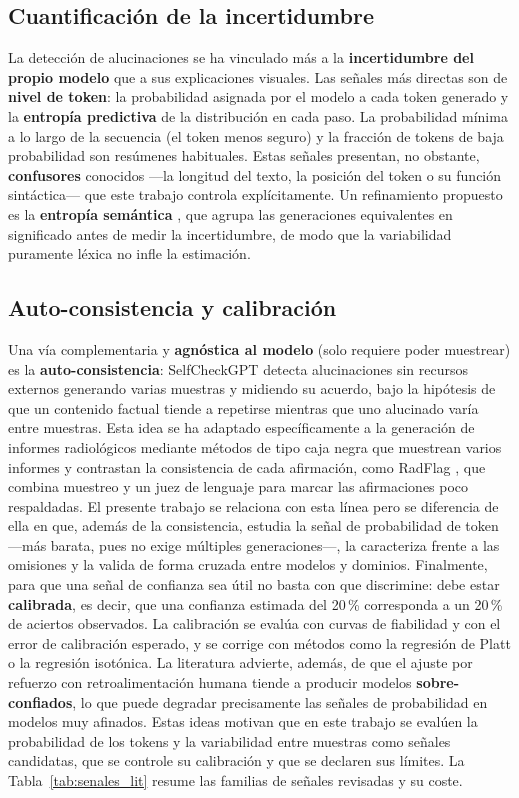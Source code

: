 \subsection{Cuantificación de la incertidumbre}
La detección de alucinaciones se ha vinculado más a la \textbf{incertidumbre del propio modelo} que a
sus explicaciones visuales. Las señales más directas son de \textbf{nivel de token}: la probabilidad
asignada por el modelo a cada token generado y la \textbf{entropía predictiva} de la distribución en
cada paso. La probabilidad mínima a lo largo de la secuencia (el token menos seguro) y la fracción de
tokens de baja probabilidad son resúmenes habituales. Estas señales presentan, no obstante,
\textbf{confusores} conocidos —la longitud del texto, la posición del token o su función sintáctica—
que este trabajo controla explícitamente. Un refinamiento propuesto es la \textbf{entropía semántica}
\parencite{kuhn2023}, que agrupa las generaciones equivalentes en significado antes de medir la
incertidumbre, de modo que la variabilidad puramente léxica no infle la estimación.

\subsection{Auto-consistencia y calibración}
Una vía complementaria y \textbf{agnóstica al modelo} (solo requiere poder muestrear) es la
\textbf{auto-consistencia}: SelfCheckGPT \parencite{manakul2023} detecta alucinaciones sin recursos
externos generando varias muestras y midiendo su acuerdo, bajo la hipótesis de que un contenido
factual tiende a repetirse mientras que uno alucinado varía entre muestras. Esta idea se ha adaptado
específicamente a la generación de informes radiológicos mediante métodos de tipo caja negra que
muestrean varios informes y contrastan la consistencia de cada afirmación, como RadFlag
\parencite{radflag2024}, que combina muestreo y un juez de lenguaje para marcar las afirmaciones poco
respaldadas. El presente trabajo se relaciona con esta línea pero se diferencia de ella en que, además
de la consistencia, estudia la señal de probabilidad de token —más barata, pues no exige múltiples
generaciones—, la caracteriza frente a las omisiones y la valida de forma cruzada entre modelos y
dominios. Finalmente, para que una
señal de confianza sea útil no basta con que discrimine: debe estar \textbf{calibrada}, es decir, que
una confianza estimada del 20\,\% corresponda a un 20\,\% de aciertos observados. La calibración se
evalúa con curvas de fiabilidad y con el error de calibración esperado, y se corrige con métodos como
la regresión de Platt o la regresión isotónica. La literatura advierte, además, de que el ajuste por
refuerzo con retroalimentación humana tiende a producir modelos \textbf{sobre-confiados}, lo que
puede degradar precisamente las señales de probabilidad en modelos muy afinados. Estas ideas motivan
que en este trabajo se evalúen la probabilidad de los tokens y la variabilidad entre muestras como
señales candidatas, que se controle su calibración y que se declaren sus límites. La
Tabla~\ref{tab:senales_lit} resume las familias de señales revisadas y su coste.

